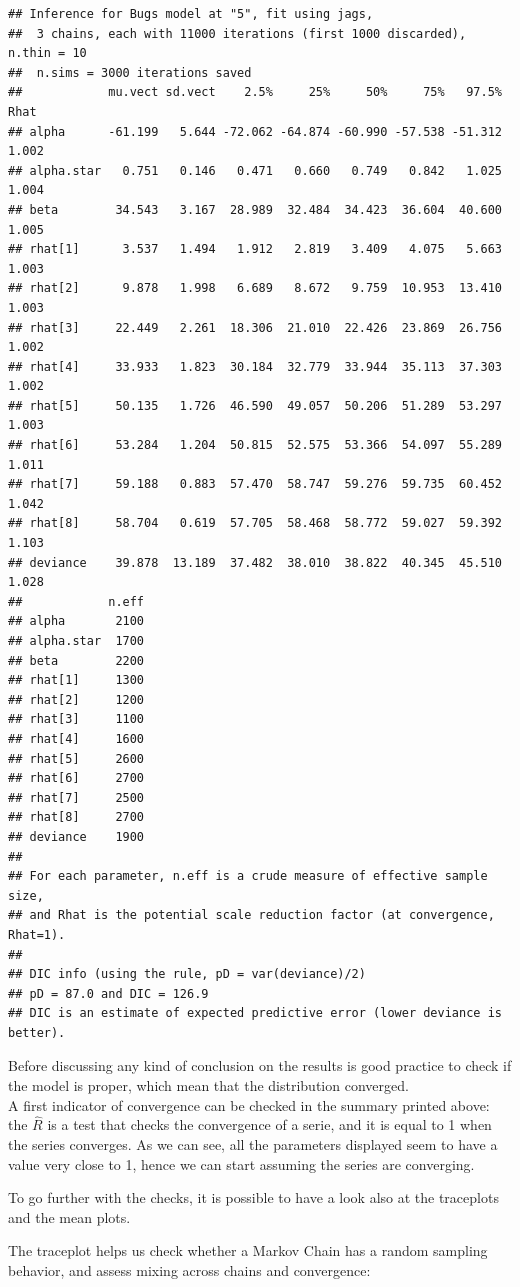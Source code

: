 \documentclass[]{article}
\begin{document}
\begin{verbatim}
## Inference for Bugs model at "5", fit using jags,
##  3 chains, each with 11000 iterations (first 1000 discarded), n.thin = 10
##  n.sims = 3000 iterations saved
##            mu.vect sd.vect    2.5%     25%     50%     75%   97.5%  Rhat
## alpha      -61.199   5.644 -72.062 -64.874 -60.990 -57.538 -51.312 1.002
## alpha.star   0.751   0.146   0.471   0.660   0.749   0.842   1.025 1.004
## beta        34.543   3.167  28.989  32.484  34.423  36.604  40.600 1.005
## rhat[1]      3.537   1.494   1.912   2.819   3.409   4.075   5.663 1.003
## rhat[2]      9.878   1.998   6.689   8.672   9.759  10.953  13.410 1.003
## rhat[3]     22.449   2.261  18.306  21.010  22.426  23.869  26.756 1.002
## rhat[4]     33.933   1.823  30.184  32.779  33.944  35.113  37.303 1.002
## rhat[5]     50.135   1.726  46.590  49.057  50.206  51.289  53.297 1.003
## rhat[6]     53.284   1.204  50.815  52.575  53.366  54.097  55.289 1.011
## rhat[7]     59.188   0.883  57.470  58.747  59.276  59.735  60.452 1.042
## rhat[8]     58.704   0.619  57.705  58.468  58.772  59.027  59.392 1.103
## deviance    39.878  13.189  37.482  38.010  38.822  40.345  45.510 1.028
##            n.eff
## alpha       2100
## alpha.star  1700
## beta        2200
## rhat[1]     1300
## rhat[2]     1200
## rhat[3]     1100
## rhat[4]     1600
## rhat[5]     2600
## rhat[6]     2700
## rhat[7]     2500
## rhat[8]     2700
## deviance    1900
## 
## For each parameter, n.eff is a crude measure of effective sample size,
## and Rhat is the potential scale reduction factor (at convergence, Rhat=1).
## 
## DIC info (using the rule, pD = var(deviance)/2)
## pD = 87.0 and DIC = 126.9
## DIC is an estimate of expected predictive error (lower deviance is better).
\end{verbatim}

Before discussing any kind of conclusion on the results is good practice
to check if the model is proper, which mean that the distribution
converged.\\
A first indicator of convergence can be checked in the summary printed
above: the \(\hat{R}\) is a test that checks the convergence of a serie,
and it is equal to 1 when the series converges. As we can see, all the
parameters displayed seem to have a value very close to 1, hence we can
start assuming the series are converging.

To go further with the checks, it is possible to have a look also at the
traceplots and the mean plots.

The traceplot helps us check whether a Markov Chain has a random
sampling behavior, and assess mixing across chains and convergence:
\end{document}
